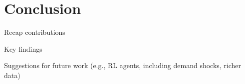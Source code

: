 \section{Conclusion}\label{sec:con}
Recap contributions

Key findings

Suggestions for future work (e.g., RL agents, including demand shocks, richer data)